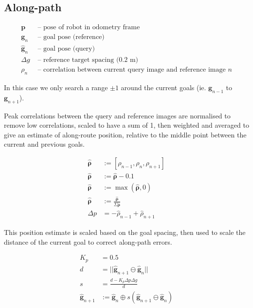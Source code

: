 \documentclass{article}
\begin{document}
\subsection{Along-path}

\begin{align*}
	\boldsymbol{p} & \text{ -- pose of robot in odometry frame} \\
	\boldsymbol{g}_n & \text{ -- goal pose (reference)} \\
	\boldsymbol{\hat g}_n & \text{ -- goal pose (query)} \\
	\Delta g & \text{ -- reference target spacing (0.2 m)} \\
	\rho_n & \text{ -- correlation between current query image and reference image } n
\end{align*}

In this case we only search a range $\pm 1$ around the current goals (ie. $\boldsymbol{g}_{n-1}$ to $\boldsymbol{g}_{n+1}$).

Peak correlations between the query and reference images are normalised to remove low correlations, scaled to have a sum of 1, then weighted and averaged to give an estimate of along-route position, relative to the middle point between the current and previous goals.

\begin{align*}
	\boldsymbol{\hat\rho} &:= [\rho_{n-1}, \rho_n, \rho_{n+1}] \\
	\boldsymbol{\hat\rho} &:= \boldsymbol{\hat\rho} - 0.1 \\
	\boldsymbol{\hat\rho} &:= \max(\boldsymbol{\hat\rho}, 0) \\
	\boldsymbol{\hat\rho} &:= \frac{\boldsymbol{\hat\rho}}{\Sigma\boldsymbol{\hat\rho}} \\
	\Delta p &= - \hat\rho_{n-1} + \hat\rho_{n+1}
\end{align*}

This position estimate is scaled based on the goal spacing, then used to scale the distance of the current goal to correct along-path errors.

\begin{align*}
	K_p &= 0.5 \\
	d &= ||\boldsymbol{\hat g}_{n+1} \ominus \boldsymbol{\hat g}_{n}||\\
	s &= \frac{d - K_p\Delta p \Delta g} {d} \\
	\boldsymbol{\hat g}_{n+1} &:= \boldsymbol{\hat g}_{n} \oplus s(\boldsymbol{\hat g}_{n+1} \ominus \boldsymbol{\hat g}_{n})
\end{align*}
\end{document}
